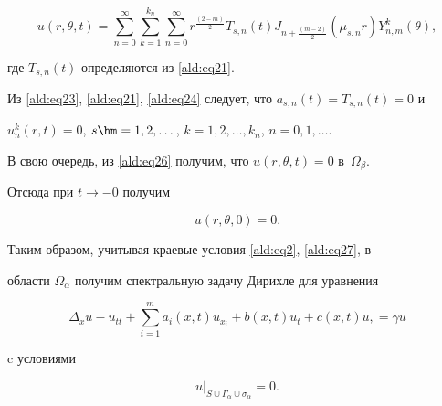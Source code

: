\begin{equation}

u(r,\theta ,t) = \sum\limits_{n = 0}^{\infty} \sum\limits_{k=1}^{k_{n}} \sum\limits_{n = 0}^{\infty}

r^{\frac{(2-m)}{2}}T_{s,n}(t) J_{n+\frac{(m-2)}{2}}(\mu_{s,n}r)Y_{n,m}^{k} (\theta ),

\label{ald:eq26}

\end{equation}

где $T_{s,n}(t)$ определяются из \eqref{ald:eq21}.



Из \eqref{ald:eq23}, \eqref{ald:eq21}, \eqref{ald:eq24} следует, что $a_{s,n}(t)= T_{s,n}(t)=0$ и

$u_n^k(r,t)=0$, $s\hm =1, 2,\dots$, $k =1,2, \dots, k_{n}$, $n = 0,1, \dots.$



В свою очередь, из \eqref{ald:eq26} получим, что $u(r,\theta,t)=0$ в~$\Omega_\beta.$



Отсюда при  $t\to -0$ получим

\begin{equation}

 u(r,\theta,0) =0.

 \label{ald:eq27}

\end{equation}



Таким образом, учитывая краевые условия \eqref{ald:eq2}, \eqref{ald:eq27}, в

области $\Omega_\alpha$ получим  спектральную задачу Дирихле для уравнения

\begin{equation}

\Delta_x u - u_{tt} + \sum\limits_{i=1}^m a_i(x,t)u_{x_i}+

b(x,t)u_t + c(x,t)u,= \gamma u 

 \label{ald:eq28}

\end{equation}

c условиями

\begin{equation}

u\big|_{S\cup \Gamma_\alpha \cup \sigma_\alpha} = 0.

 \label{ald:eq29}

\end{equation}



